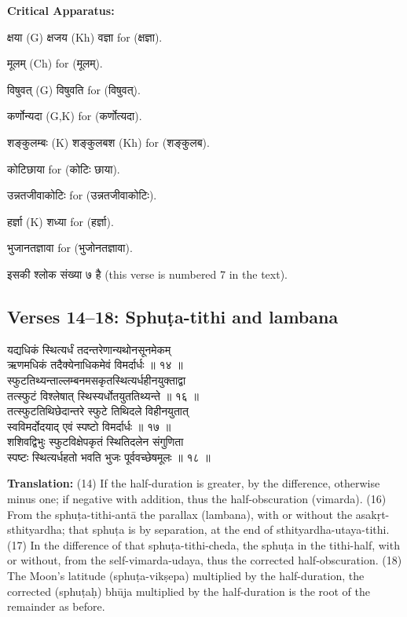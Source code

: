 \documentclass[11pt,a4paper]{article}
\newcommand{\dev}[1]{{\devanagarifont #1}}
\newcommand{\sanskritcol}[1]{%
  \begin{minipage}[t]{0.47\textwidth}
  \vspace{0pt}
  \begin{flushleft}
  #1
  \end{flushleft}
  \end{minipage}%
  \hfill
}
\newcommand{\englishcol}[1]{%
  \begin{minipage}[t]{0.47\textwidth}
  \vspace{0pt}
  \begin{flushleft}
  #1
  \end{flushleft}
  \end{minipage}%
}
\newenvironment{variants}{%
  \small%
  \color{varecolor}%
  \list{}{\leftmargin=2em\itemindent=-1em}%
}{\endlist}
\begin{document}
\vspace{0.4cm}
\textcolor{varecolor}{\textbf{Critical Apparatus:}}
\begin{variants}
\item[7.1] \dev{क्षया} (G) \dev{क्षजय} (Kh) \dev{वज्ञा} \dev{for} (\dev{क्षज्ञा}).
\item[7.2] \dev{मूलम्} (Ch) \dev{for} (\dev{मूलम्}).
\item[7.3] \dev{विषुवत्} (G) \dev{विषुवति} \dev{for} (\dev{विषुवत्}).
\item[7.4] \dev{कर्णोन्यदा} (G,K) \dev{for} (\dev{कर्णोत्यदा}).
\item[7.5] \dev{शङ्कुलम्बः} (K) \dev{शङ्कुलबश} (Kh) \dev{for} (\dev{शङ्कुलब}).
\item[8.1] \dev{कोटिछाया} \dev{for} (\dev{कोटिः छाया}).
\item[8.2] \dev{उन्नतजीवाकोटिः} \dev{for} (\dev{उन्नतजीवाकोटिः}).
\item[8.3] \dev{हर्ज्ञा} (K) \dev{शध्या} \dev{for} (\dev{हर्ज्ञा}).
\item[8.4] \dev{भुजानतज्ञावा} \dev{for} (\dev{भुजोनतज्ञावा}).
\item[\dev{वि०}] \dev{इसकी श्लोक संख्या ७ है} (this verse is numbered 7 in the text).
\end{variants}

\subsection*{Verses 14--18: Sphuṭa-tithi and lambana}

\noindent
\sanskritcol{\dev{यद्यधिकं स्थित्यर्धं तदन्तरेणान्यथोनसूनमेकम्} \\ \dev{ऋणमधिकं तदैक्येनाधिकमेवं विमर्दार्धः ॥ १४ ॥} \\[0.2cm]
\dev{स्फुटतिथ्यन्ताल्लम्बनमसकृतस्थित्यर्धहीनयुक्ताद्वा} \\ \dev{तत्स्फुटं विश्लेषात् स्थिस्यर्धोतयुततिथ्यन्ते ॥ १६ ॥} \\[0.2cm]
\dev{तत्स्फुटतिथिछेदान्तरे स्फुटे तिथिदले विहीनयुतात्} \\ \dev{स्वविमर्दोदयाद् एवं स्पष्टो विमर्दार्धः ॥ १७ ॥} \\[0.2cm]
\dev{शशिवद्विभुः स्फुटविक्षेपकृतं स्थितिदलेन संगुणिता} \\ \dev{स्पष्टः स्थित्यर्धहतो भवति भुजः पूर्ववच्छेषमूलः ॥ १८ ॥}}
\englishcol{\textbf{Translation:} (14) If the half-duration is greater, by the difference,
otherwise minus one; if negative with addition, thus the half-obscuration (vimarda).
(16) From the sphuṭa-tithi-antā the parallax (lambana), with or without the
asakṛt-sthityardha; that sphuṭa is by separation, at the end of sthityardha-utaya-tithi.
(17) In the difference of that sphuṭa-tithi-cheda, the sphuṭa in the tithi-half,
with or without, from the self-vimarda-udaya, thus the corrected half-obscuration.
(18) The Moon's latitude (sphuṭa-vikṣepa) multiplied by the half-duration, the
corrected (sphuṭaḥ) bhūja multiplied by the half-duration is the root of the
remainder as before.}
\end{document}
